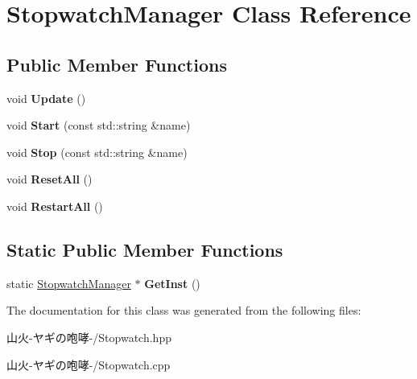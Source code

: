 \hypertarget{class_stopwatch_manager}{}\section{Stopwatch\+Manager Class Reference}
\label{class_stopwatch_manager}
\subsection*{Public Member Functions}
\begin{DoxyCompactItemize}
\item 
void {\bfseries Update} ()\hypertarget{class_stopwatch_manager_a187530b1d6c6d0514b88904cf40ffdbc}{}\label{class_stopwatch_manager_a187530b1d6c6d0514b88904cf40ffdbc}

\item 
void {\bfseries Start} (const std\+::string \&name)\hypertarget{class_stopwatch_manager_ae7e35f9e2c94ab89b44235123124142c}{}\label{class_stopwatch_manager_ae7e35f9e2c94ab89b44235123124142c}

\item 
void {\bfseries Stop} (const std\+::string \&name)\hypertarget{class_stopwatch_manager_a2d52a93ba6f1028d6565befdcb5d72e9}{}\label{class_stopwatch_manager_a2d52a93ba6f1028d6565befdcb5d72e9}

\item 
void {\bfseries Reset\+All} ()\hypertarget{class_stopwatch_manager_a1200987aa479cac55188693d1765e461}{}\label{class_stopwatch_manager_a1200987aa479cac55188693d1765e461}

\item 
void {\bfseries Restart\+All} ()\hypertarget{class_stopwatch_manager_a6cc6d6fcf26aa84952ef5febe893a864}{}\label{class_stopwatch_manager_a6cc6d6fcf26aa84952ef5febe893a864}

\end{DoxyCompactItemize}
\subsection*{Static Public Member Functions}
\begin{DoxyCompactItemize}
\item 
static \hyperlink{class_stopwatch_manager}{Stopwatch\+Manager} $\ast$ {\bfseries Get\+Inst} ()\hypertarget{class_stopwatch_manager_af5514df7db7f32c0c61570af900448dc}{}\label{class_stopwatch_manager_af5514df7db7f32c0c61570af900448dc}

\end{DoxyCompactItemize}


The documentation for this class was generated from the following files\+:\begin{DoxyCompactItemize}
\item 
山火-\/ヤギの咆哮-\//Stopwatch.\+hpp\item 
山火-\/ヤギの咆哮-\//Stopwatch.\+cpp\end{DoxyCompactItemize}
